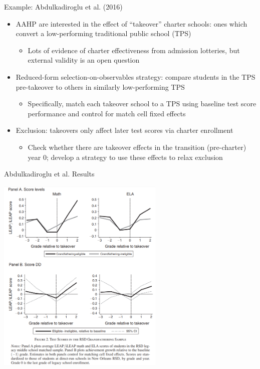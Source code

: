\documentclass[11pt,english]{beamer}
\begin{document}
\begin{frame}{Example: Abdulkadiroglu et al. (2016)}

\begin{itemize}
\item AAHP are interested in the effect of ``takeover'' charter schools: ones which convert a low-performing traditional public school (TPS)\smallskip
\begin{itemize}
\item Lots of evidence of charter effectiveness from admission lotteries, but external validity is an open question
\end{itemize}\bigskip\pause{}

\item Reduced-form selection-on-observables strategy: compare students in the TPS pre-takeover to others in similarly low-performing TPS\smallskip
\begin{itemize}
\item Specifically, match each takeover school to a TPS using baseline test score performance and control for match cell fixed effects 
\end{itemize}\bigskip\pause{}

\item Exclusion: takeovers only affect later test scores via charter enrollment\smallskip
\begin{itemize}
\item Check whether there are takeover effects in the transition (pre-charter) year 0; develop a strategy to use these effects to relax exclusion
\end{itemize}
\end{itemize}

\end{frame}

\begin{frame}{ Abdulkadiroglu et al. Results}
\begin{center}
	\includegraphics[width=0.6\textwidth]{figures/aahp.png}
\end{center}
\end{frame}
\end{document}
